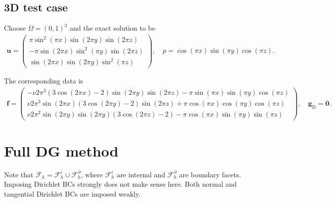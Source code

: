 \documentclass[11pt,a4paper,oneside,onecolumn]{scrartcl}
\newcommand{\ff}{{ \boldsymbol{f} }}
\newcommand{\uu}{{ \boldsymbol{u} }}
\newcommand{\zero}{{ \boldsymbol{0} }}
\newcommand{\gbld}{{ \boldsymbol{g} }}
\newcommand{\Drm}{{ \mathrm{D} }}
\newcommand{\F}{{ \mathcal{F}_h }}
\newcommand{\Fi}{{ \mathcal{F}_h^i }}
\newcommand{\Fb}{{ \mathcal{F}_h^\partial }}
\newcommand\rb[1]{{ \left(#1\right) }}
\begin{document}
\subsection{3D test case}	

Choose $\Omega=\rb{0,1}^3$ and the exact solution to be 
\begin{align*}
	\uu = \begin{pmatrix}
		\pi \sin^2(\pi x) \sin(2 \pi y) \sin(2\pi z) \\
		-\pi \sin(2 \pi x) \sin^2(\pi y) \sin(2\pi z) \\
		\sin(2 \pi x) \sin(2 \pi y) \sin^2(\pi z)
	\end{pmatrix},
	\quad
	p = \cos(\pi x) \sin(\pi y) \cos(\pi z).
\end{align*}

The corresponding data is 
\begin{align*}
	\ff = \begin{pmatrix}
		-\nu 2\pi^3 (3\cos(2\pi x)-2)\sin(2\pi y)\sin(2\pi z) -\pi\sin(\pi x)\sin(\pi y) \cos(\pi z) \\
		\nu 2\pi^3\sin(2\pi x)(3\cos(2\pi y)-2)\sin(2\pi z) +\pi\cos(\pi x)\cos(\pi y) \cos(\pi z) \\
		\nu 2\pi^2\sin(2\pi y)\sin(2\pi y)(3\cos(2\pi z)-2) -\pi\cos(\pi x)\sin(\pi y)\sin(\pi z)
	\end{pmatrix},
	\quad
	\gbld_\Drm = \zero. 
\end{align*}


\newpage
\section{Full DG method}	

Note that $\F=\Fi\cup\Fb$, where $\Fi$ are internal and $\Fb$ are boundary facets. \\

Imposing Dirichlet BCs strongly does not make sense here. Both normal and tangential Dirichlet BCs are imposed weakly.
\end{document}
